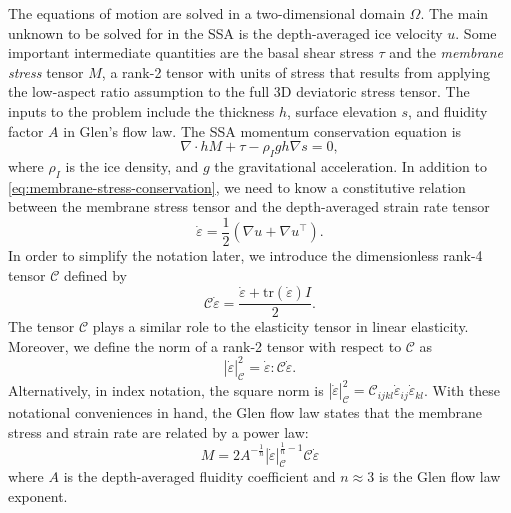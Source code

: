 \documentclass[review,oneside]{igs}
\begin{document}
The equations of motion are solved in a two-dimensional domain $\Omega$.
The main unknown to be solved for in the SSA is the depth-averaged ice velocity $u$.
Some important intermediate quantities are the basal shear stress $\tau$ and the \emph{membrane stress} tensor $M$, a rank-2 tensor with units of stress that results from applying the low-aspect ratio assumption to the full 3D deviatoric stress tensor.
The inputs to the problem include the thickness $h$, surface elevation $s$, and fluidity factor $A$ in Glen's flow law.
The SSA momentum conservation equation is
\begin{equation}
    \nabla\cdot hM + \tau - \rho_I gh\nabla s = 0,
    \label{eq:membrane-stress-conservation}
\end{equation}
where $\rho_I$ is the ice density, and $g$ the gravitational acceleration.
In addition to \eqref{eq:membrane-stress-conservation}, we need to know a constitutive relation between the membrane stress tensor and the depth-averaged strain rate tensor
\begin{equation}
    \dot\varepsilon = \frac{1}{2}\left(\nabla u + \nabla u^\top\right).
    \label{eq:strain-rate}
\end{equation}
In order to simplify the notation later, we introduce the dimensionless rank-4 tensor $\mathscr{C}$ defined by
\begin{equation}
    \mathscr{C}\dot\varepsilon = \frac{\dot\varepsilon + \text{tr}(\dot\varepsilon)I}{2}.
    \label{eq:elasticity-tensor}
\end{equation}
The tensor $\mathscr{C}$ plays a similar role to the elasticity tensor in linear elasticity.
Moreover, we define the norm of a rank-2 tensor with respect to $\mathscr{C}$ as
\begin{equation}
    |\dot\varepsilon|_{\mathscr{C}}^2 = \dot\varepsilon : \mathscr{C}\dot\varepsilon.
\end{equation}
Alternatively, in index notation, the square norm is $|\dot\varepsilon|_{\mathscr C}^2 = \mathscr{C}_{ijkl}\dot\varepsilon_{ij}\dot\varepsilon_{kl}$.
With these notational conveniences in hand, the Glen flow law states that the membrane stress and strain rate are related by a power law:
\begin{equation}
    M = 2A^{-\frac{1}{n}}|\dot\varepsilon|_{\mathscr C}^{\frac{1}{n} - 1}\mathscr{C}\dot\varepsilon
    \label{eq:constitutive-relation}
\end{equation}
where $A$ is the depth-averaged fluidity coefficient and $n \approx 3$ is the Glen flow law exponent.
\end{document}
